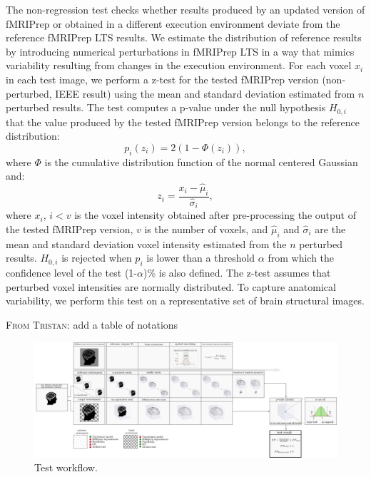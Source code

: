 \documentclass{article}
\newcommand{\TG}[1]{\color{blue}\textsc{From Tristan:} #1\color{black}\xspace}
\begin{document}
The non-regression test checks whether results produced by an updated version of
fMRIPrep or obtained in a different execution environment deviate from the
reference fMRIPrep LTS results. We estimate the distribution of reference
results by introducing numerical perturbations in fMRIPrep LTS in a way that
mimics variability resulting from changes in the execution environment.  For
each voxel $x_i$ in each test image, we perform a z-test for the tested fMRIPrep
version (non-perturbed, IEEE result) using the mean and standard deviation
estimated from $n$ perturbed results. The test computes a p-value under the null
hypothesis $H_{0,i}$ that the value produced by the tested fMRIPrep version
belongs to the reference distribution:
\begin{equation}
    \label{eqn:pval}
    p_i(z_i) = 2 \left(1-\Phi(z_i)\right),
\end{equation}
where $\Phi$ is the cumulative distribution function of the normal centered
Gaussian and:
\begin{equation*}
    z_i = \frac{x_i-\hat \mu_i}{\hat \sigma_i},
\end{equation*}
where $x_i$, $i < v$ is the voxel intensity obtained after pre-processing the
output of the tested fMRIPrep version, $v$ is the number of voxels, and $\hat
    \mu_i$ and $\hat \sigma_i$ are the mean and standard deviation voxel intensity
estimated from the $n$ perturbed results. $H_{0,i}$ is rejected when $p_i$ is
lower than a threshold $\alpha$ from which the confidence level of the test
(1-$\alpha$)\% is also defined. The z-test assumes that perturbed voxel
intensities are normally distributed. To capture anatomical variability, we
perform this test on a representative set of brain structural images.

\TG{add a table of notations}

\begin{figure}
    \centering
    \includegraphics[width=\linewidth]{figures/stat_test_procedure.pdf}
    \caption{Test workflow.}
    \label{fig:test_workflow}
\end{figure}
\end{document}
